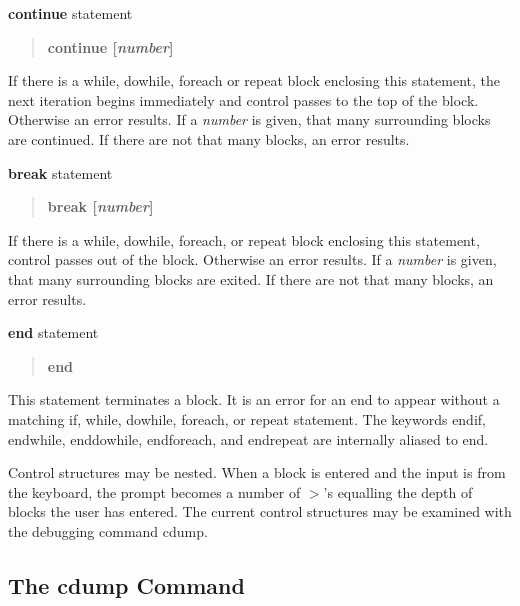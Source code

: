 \begin{description}
\item{{\bf continue} statement}\\

\begin{quote}
{\bf\vt continue [{\it number}]}
\end{quote}
If there is a {\et while}, {\et dowhile}, {\et foreach} or {\et
repeat} block enclosing this statement, the next iteration begins
immediately and control passes to the top of the block.  Otherwise an
error results.  If a {\it number} is given, that many surrounding
blocks are continued.  If there are not that many blocks, an error
results.

\item{{\bf break} statement}\\

\begin{quote}
{\bf\vt break [{\it number}]}
\end{quote}
If there is a {\et while}, {\et dowhile}, {\et foreach}, or {\et
repeat} block enclosing this statement, control passes out of the
block.  Otherwise an error results.  If a {\it number} is given, that
many surrounding blocks are exited.  If there are not that many
blocks, an error results.

\item{{\bf end} statement}\\

\begin{quote}
{\bf\vt end}
\end{quote}
This statement terminates a block.  It is an error for an {\et end} to
appear without a matching {\et if}, {\et while}, {\et dowhile}, {\et
foreach}, or {\et repeat} statement.  The keywords {\et endif}, {\et
endwhile}, {\et enddowhile}, {\et endforeach}, and {\et endrepeat} are
internally aliased to {\et end}.
\end{description}

Control structures may be nested.  When a block is entered and the
input is from the keyboard, the prompt becomes a number of $>$'s
equalling the depth of blocks the user has entered.  The current
control structures may be examined with the debugging command {\cb
cdump}.

\newcommand{\spcmd}[1]{The {\cb #1} Command}

\subsection{\spcmd{cdump}}

